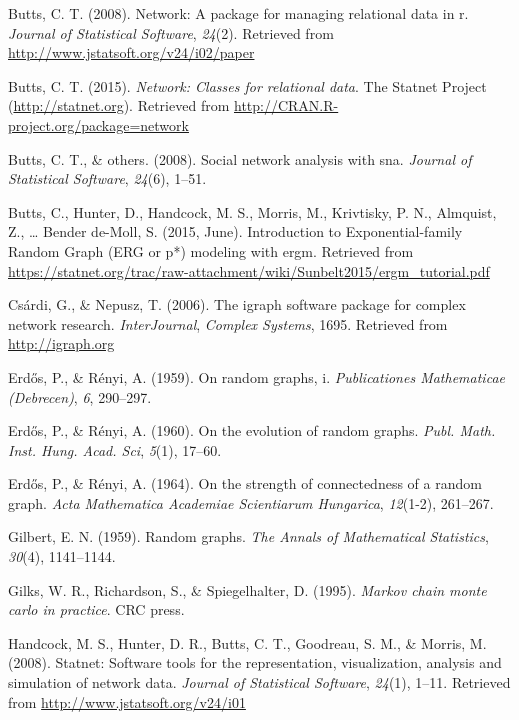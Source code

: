 \documentclass[12pt,twoside]{amherstthesis}
\begin{document}
  \hypertarget{ref-networkpackagearticle}{}
  Butts, C. T. (2008). Network: A package for managing relational data in
  r. \emph{Journal of Statistical Software}, \emph{24}(2). Retrieved from
  \url{http://www.jstatsoft.org/v24/i02/paper}
  
  \hypertarget{ref-networkpackagemanual}{}
  Butts, C. T. (2015). \emph{Network: Classes for relational data}. The
  Statnet Project (\url{http://statnet.org}). Retrieved from
  \url{http://CRAN.R-project.org/package=network}
  
  \hypertarget{ref-butts2008social}{}
  Butts, C. T., \& others. (2008). Social network analysis with sna.
  \emph{Journal of Statistical Software}, \emph{24}(6), 1--51.
  
  \hypertarget{ref-butts_introduction_2015}{}
  Butts, C., Hunter, D., Handcock, M. S., Morris, M., Krivtisky, P. N.,
  Almquist, Z., \ldots{} Bender de-Moll, S. (2015, June). Introduction to
  Exponential-family Random Graph (ERG or p*) modeling with ergm.
  Retrieved from
  \url{https://statnet.org/trac/raw-attachment/wiki/Sunbelt2015/ergm_tutorial.pdf}
  
  \hypertarget{ref-igraphpackage}{}
  Csárdi, G., \& Nepusz, T. (2006). The igraph software package for
  complex network research. \emph{InterJournal}, \emph{Complex Systems},
  1695. Retrieved from \url{http://igraph.org}
  
  \hypertarget{ref-erdos1959random}{}
  Erd\H{o}s, P., \& Rényi, A. (1959). On random graphs, i.
  \emph{Publicationes Mathematicae (Debrecen)}, \emph{6}, 290--297.
  
  \hypertarget{ref-erdos1960evolution}{}
  Erd\H{o}s, P., \& Rényi, A. (1960). On the evolution of random graphs.
  \emph{Publ. Math. Inst. Hung. Acad. Sci}, \emph{5}(1), 17--60.
  
  \hypertarget{ref-erdHos1964strength}{}
  Erd\H{o}s, P., \& Rényi, A. (1964). On the strength of connectedness of
  a random graph. \emph{Acta Mathematica Academiae Scientiarum Hungarica},
  \emph{12}(1-2), 261--267.
  
  \hypertarget{ref-gilbert1959random}{}
  Gilbert, E. N. (1959). Random graphs. \emph{The Annals of Mathematical
  Statistics}, \emph{30}(4), 1141--1144.
  
  \hypertarget{ref-gilks1995markov}{}
  Gilks, W. R., Richardson, S., \& Spiegelhalter, D. (1995). \emph{Markov
  chain monte carlo in practice}. CRC press.
  
  \hypertarget{ref-statnetpackagearticle}{}
  Handcock, M. S., Hunter, D. R., Butts, C. T., Goodreau, S. M., \&
  Morris, M. (2008). Statnet: Software tools for the representation,
  visualization, analysis and simulation of network data. \emph{Journal of
  Statistical Software}, \emph{24}(1), 1--11. Retrieved from
  \url{http://www.jstatsoft.org/v24/i01}
  
\end{document}
